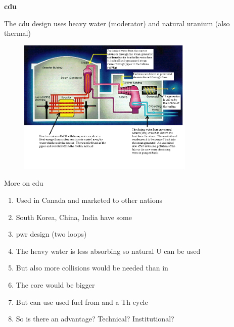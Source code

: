 \documentclass[aspectratio=1610,pdftex,dvipsnames,compress,xcolor={dvipsnames}]{beamer}
\newcommand{\acs}{\acrshort} %
\newcommand{\acsp}{\acrshortpl} %
\begin{document}
\begin{frame}[plain]{}
    \centering\LARGE\textbf{\acs{cdu}}
\end{frame}


\addtocounter{framenumber}{-1} 
\begin{frame}{The \acs{cdu} design uses heavy water (moderator) and natural uranium (also thermal)}
    \begin{figure}
        \centering
        \includegraphics[width=0.75\textwidth]{CANDU.jpg}
    \end{figure}
\end{frame}


\begin{frame}{More on \acs{cdu}}
    \begin{enumerate}[series=outerlist,topsep=0pt,itemsep=18pt,leftmargin=*,label=(\arabic*)]
        \item[]Used in Canada and marketed to other nations
        \item[]South Korea, China, India have some
        \item[]\acs{pwr} design (two loops)
        \item[]The heavy water is less absorbing so natural U can be used
        \item[]But also more collisions would be needed than in \acsp{lwr}
        \item[]The core would be bigger
        \item[]But can use used fuel from \acsp{lwr} and a Th cycle
        \item[]So is there an advantage?  Technical?  Institutional?
    \end{enumerate}
\end{frame}
\end{document}
